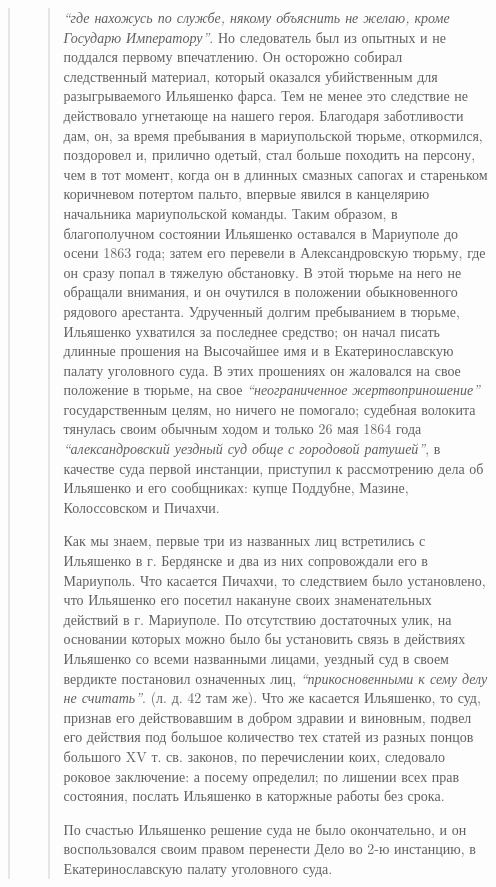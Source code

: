 \begin{quote}
\begin{quote}
\emph{``где нахожусь по службе, някому объяснить не желаю, кроме Государю Императору''}. 
Но следователь был из опытных и не поддался первому впечатлению. Он осторожно собирал следственный материал, который оказался
убийственным для разыгрываемого Ильяшенко фарса.
Тем не менее это следствие не действовало угнетающе на нашего героя. 
Благодаря заботливости дам, он, за время пребывания в мариупольской тюрьме, откормился, 
поздоровел и, прилично одетый, стал больше походить на персону, чем в тот
момент, когда он в длинных смазных сапогах и стареньком коричневом потертом пальто, 
впервые явился в
канцелярию начальника мариупольской команды. Таким образом, в благополучном состоянии Ильяшенко оставался в Мариуполе до осени
1863 года; затем его перевели в
Александровскую тюрьму, где он сразу попал в тяжелую
обстановку. В этой тюрьме на него не обращали внимания,
и он очутился в положении обыкновенного рядового арестанта.
Удрученный долгим пребыванием в тюрьме, Ильяшенко ухватился за последнее средство; он начал писать длинные прошения на Высочайшее имя и в Екатеринославскую палату уголовного суда. В этих прошениях он жаловался на свое положение в тюрьме, 
на свое \emph{``неограниченное жертвоприношение''} государственным целям, но ничего не помогало; судебная волокита тянулась
своим обычным ходом и только 26 мая 1864 года
\emph{``александровский уездный суд обще с городовой ратушей''},
в качестве суда первой инстанции, приступил к рассмотрению дела об Ильяшенко и его сообщниках:
купце Поддубне, Мазине, Колоссовском и Пичахчи.

Как мы знаем, первые три из названных лиц
встретились с Ильяшенко в г. Бердянске и два из них
сопровождали его в Мариуполь. Что касается Пичахчи, то
следствием было установлено, что Ильяшенко его посетил накануне своих знаменательных действий в г. Мариуполе.
По отсутствию достаточных улик, на основании которых
можно было бы установить связь в действиях Ильяшенко
со всеми названными лицами, уездный суд в своем вердикте постановил
означенных лиц, \emph{``прикосновенными к сему делу не считать''}. (л. д. 42 там же). 
Что же касается Ильяшенко, то суд, признав его действовавшим в добром здравии и
виновным, подвел его действия под большое количество тех статей из разных
понцов большого XV т. св. законов, по перечислении коих, следовало роковое
заключение: а посему определил; по лишении всех прав состояния, послать
Ильяшенко в каторжные работы без срока.

По счастью Ильяшенко решение суда не было окончательно, и он воспользовался 
своим правом перенести Дело во 2-ю инстанцию, в Екатеринославскую палату уголовного суда. 


\end{quote}
\end{quote}
